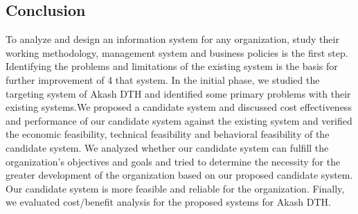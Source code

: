 \begin{spacing}{1}
\section{Conclusion}
To analyze and design an information system for any organization, study their working methodology, management system and business policies is the first step. Identifying the problems and limitations of the existing system is the basis for further improvement of 4 that system. In the initial phase, we studied the targeting system of Akash DTH and identified some primary problems with their existing systems.We proposed a candidate system and discussed cost effectiveness and performance of our candidate system against the existing system and verified the economic feasibility, technical feasibility and behavioral feasibility of the candidate system. We analyzed whether our  candidate system can fulfill the organization’s objectives and goals and tried to determine the necessity for the greater development of the organization based on our proposed candidate system. Our candidate system is more feasible and reliable for the organization. Finally, we evaluated cost/benefit analysis for the proposed systems for Akash DTH.
\end{spacing}
